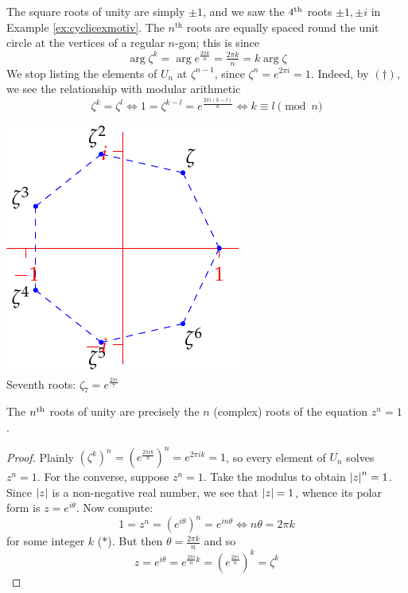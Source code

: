 \begin{minipage}[t]{0.67\linewidth}\vspace{0pt}
The square roots of unity are simply $\pm 1$, and we saw the $4\textsuperscript{th}$ roots $\pm 1,\pm i$ in Example \ref{ex:cyclicexmotiv}. The $n^\text{th}$ roots are equally spaced round the unit circle at the vertices of a regular $n$-gon; this is since
\[\arg\zeta^k=\arg e^{\frac{2\pi k}{n}}=\tfrac{2\pi k}n=k\arg\zeta\]
We stop listing the elements of $U_n$ at $\zeta^{n-1}$, since $\zeta^n=e^{2\pi i}=1$. Indeed, by $(\dag)$, we see the relationship with modular arithmetic
\[\zeta^k=\zeta^l\iff 1=\zeta^{k-l}=e^{\frac{2\pi i(k-l)}n}\iff k\equiv l\pmod n\]
\end{minipage}\hfill\begin{minipage}[t]{0.24\linewidth}\vspace{0pt}
\centering
\includegraphics[scale=0.8]{cyclic-rootunity}\\
Seventh roots: $\zeta_7=e^{\frac{2\pi i}7}$
\end{minipage}\medbreak


\begin{thm}{}{}
The $n\textsuperscript{th}$ roots of unity are precisely the $n$ (complex) roots of the equation $z^n=1$.\
\end{thm}

\begin{proof}
Plainly $(\zeta^k)^n=(e^{\frac{2\pi ik}n})^n=e^{2\pi ik}=1$, so every element of $U_n$ solves $z^n=1$.\smallbreak
For the converse, suppose $z^n=1$. Take the modulus to obtain $\left| z\right|^n=1$. Since $\left| z\right|$ is a non-negative real number, we see that $\left| z\right|=1$, whence its polar form is $z=e^{i\theta}$. Now compute:
\[1=z^n=(e^{i\theta})^n=e^{in\theta}\iff n\theta=2\pi k\]
for some integer $k$ ($\ast$). But then $\theta=\frac{2\pi k}n$ and so
\[z=e^{i\theta}=e^{\frac{2\pi i}nk}=\left(e^{\frac{2\pi i}n}\right)^k=\zeta^k\tag*{\qedhere}\]
\end{proof}


